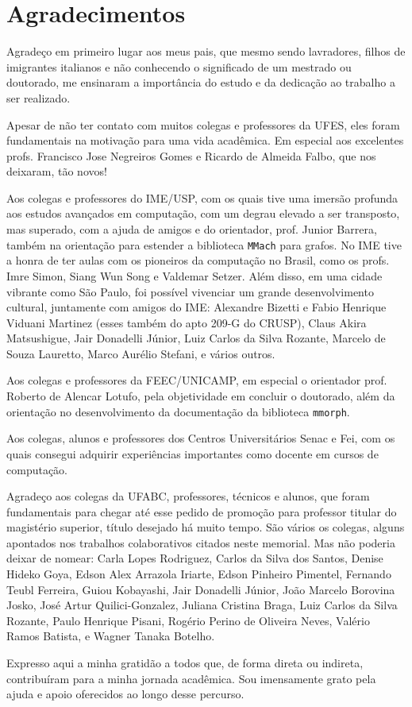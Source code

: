 \chapter*{Agradecimentos}

Agradeço em primeiro lugar aos meus pais, que mesmo sendo lavradores, filhos de imigrantes italianos e não conhecendo o significado de um mestrado ou doutorado, me ensinaram a importância do estudo e da dedicação ao trabalho a ser realizado.

Apesar de não ter contato com muitos colegas e professores da UFES, eles foram fundamentais na motivação para uma vida acadêmica. Em especial aos excelentes profs. Francisco Jose Negreiros Gomes e Ricardo de Almeida Falbo, que nos deixaram, tão novos!

Aos colegas e professores do IME/USP, com os quais tive uma imersão profunda aos estudos avançados em computação, com um degrau elevado a ser transposto, mas superado, com a ajuda de amigos e do  orientador, prof. Junior Barrera, também na orientação para estender a biblioteca \texttt{MMach} para grafos. No IME tive a honra de ter aulas com os pioneiros da computação no Brasil, como os profs. Imre Simon, Siang Wun Song e Valdemar Setzer. Além disso, em uma cidade vibrante como São Paulo, foi possível vivenciar um grande desenvolvimento cultural, juntamente com amigos do IME: Alexandre Bizetti e Fabio Henrique Viduani Martinez (esses também do apto 209-G do CRUSP), Claus Akira Matsushigue, Jair Donadelli Júnior, Luiz Carlos da Silva Rozante, Marcelo de Souza Lauretto, Marco Aurélio Stefani, e vários outros.

Aos colegas e professores da FEEC/UNICAMP, em especial o orientador prof. Roberto de Alencar Lotufo, pela objetividade em concluir o doutorado, além da orientação no desenvolvimento da documentação da biblioteca \texttt{mmorph}.

Aos colegas, alunos e professores dos Centros Universitários Senac e Fei, com os quais consegui adquirir experiências importantes como docente em cursos de computação.

Agradeço aos colegas da UFABC, professores, técnicos e alunos, que foram fundamentais para chegar até esse pedido de promoção para professor titular do magistério superior, título desejado há muito tempo. São vários os colegas, alguns apontados nos trabalhos colaborativos citados neste memorial. Mas não poderia deixar de nomear: 
Carla Lopes Rodriguez,
Carlos da Silva dos Santos,
Denise Hideko Goya,
Edson Alex Arrazola Iriarte,
Edson Pinheiro Pimentel,
Fernando Teubl Ferreira,
Guiou Kobayashi,
Jair Donadelli Júnior,
João Marcelo Borovina Josko,
José Artur Quilici-Gonzalez, 
Juliana Cristina Braga,
Luiz Carlos da Silva Rozante,
Paulo Henrique Pisani,
Rogério Perino de Oliveira Neves,
Valério Ramos Batista, e
Wagner Tanaka Botelho.

Expresso aqui a minha gratidão a todos que, de forma direta ou indireta, contribuíram para a minha jornada acadêmica. Sou imensamente grato pela ajuda e apoio oferecidos ao longo desse percurso.

